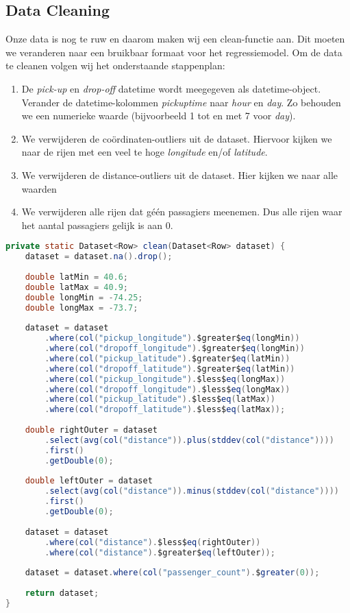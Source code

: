 \documentclass[a4paper,10pt,twoside]{report}
\begin{document}
\newpage

\subsection*{Data Cleaning}

Onze data is nog te ruw en daarom maken wij een clean-functie aan. Dit moeten we veranderen naar een bruikbaar formaat voor het regressiemodel. Om de data te cleanen volgen wij het onderstaande stappenplan:

\begin{enumerate}
	\item De \textit{pick-up} en \textit{drop-off} datetime wordt meegegeven als datetime-object. Verander de datetime-kolommen \textit{pickuptime} naar \textit{hour} en \textit{day}. Zo behouden we een numerieke waarde (bijvoorbeeld 1 tot en met 7 voor \textit{day}).
	\item We verwijderen de coördinaten-outliers uit de dataset. Hiervoor kijken we naar de rijen met een veel te hoge \textit{longitude} en/of \textit{latitude}.

	\item We verwijderen de distance-outliers uit de dataset. Hier kijken we naar alle waarden 
		
	\item We verwijderen alle rijen dat géén passagiers meenemen. Dus alle rijen waar het aantal passagiers gelijk is aan 0.
\end{enumerate}

\begin{lstlisting}[language=Java]
private static Dataset<Row> clean(Dataset<Row> dataset) {
	dataset = dataset.na().drop();
	
	double latMin = 40.6;
	double latMax = 40.9;
	double longMin = -74.25;
	double longMax = -73.7;
	
	dataset = dataset
		.where(col("pickup_longitude").$greater$eq(longMin))
		.where(col("dropoff_longitude").$greater$eq(longMin))
		.where(col("pickup_latitude").$greater$eq(latMin))
		.where(col("dropoff_latitude").$greater$eq(latMin))
		.where(col("pickup_longitude").$less$eq(longMax))
		.where(col("dropoff_longitude").$less$eq(longMax))
		.where(col("pickup_latitude").$less$eq(latMax))
		.where(col("dropoff_latitude").$less$eq(latMax));
		
	double rightOuter = dataset
		.select(avg(col("distance")).plus(stddev(col("distance"))))
		.first()
		.getDouble(0);
	
	double leftOuter = dataset
		.select(avg(col("distance")).minus(stddev(col("distance"))))
		.first()
		.getDouble(0); 
	
	dataset = dataset
		.where(col("distance").$less$eq(rightOuter))
		.where(col("distance").$greater$eq(leftOuter));
	
	dataset = dataset.where(col("passenger_count").$greater(0));
	
	return dataset;
}
\end{lstlisting}
\end{document}
